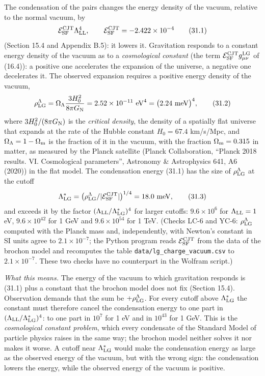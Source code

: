 \documentclass[
  10pt,
]{article}
\begin{document}
The condensation of the pairs changes the energy density of the vacuum,
relative to the normal vacuum, by
\[\mathcal E^{\rm CJT}_{\rm SF}\Lambda_{\rm LL}^4,\qquad\mathcal E^{\rm CJT}_{\rm SF}=-2.422\times10^{-4}\tag{31.1}\]
(Section 15.4 and Appendix B.5): it lowers it. Gravitation responds to a
constant energy density of the vacuum as to a \emph{cosmological
constant} (the term \(\mathcal E^{\rm CJT}_{\rm SF}g^{\rm LG}_{\mu\nu}\)
of (16.4)): a positive one accelerates the expansion of the universe, a
negative one decelerates it. The observed expansion requires a positive
energy density of the vacuum,
\[\rho^\Lambda_{\rm LG}=\Omega_\Lambda\frac{3H_0^2}{8\pi G_{\rm N}}=2.52\times10^{-11}\ {\rm eV}^4=\big(2.24\ {\rm meV}\big)^4,\tag{31.2}\]
where \(3H_0^2/(8\pi G_{\rm N})\) is the \emph{critical density}, the
density of a spatially flat universe that expands at the rate of the
Hubble constant \(H_0=67.4\) km/s/Mpc, and
\(\Omega_\Lambda=1-\Omega_{\rm m}\) is the fraction of it in the vacuum,
with the fraction \(\Omega_{\rm m}=0.315\) in matter, as measured by the
Planck satellite (Planck Collaboration, ``Planck 2018 results. VI.
Cosmological parameters'', Astronomy \& Astrophysics 641, A6 (2020)) in
the flat model. The condensation energy (31.1) has the size of
\(\rho^\Lambda_{\rm LG}\) at the cutoff
\[\Lambda^*_{\rm LG}=\big(\rho^\Lambda_{\rm LG}/\lvert\mathcal E^{\rm CJT}_{\rm SF}\rvert\big)^{1/4}=18.0\ {\rm meV},\tag{31.3}\]
and exceeds it by the factor \((\Lambda_{\rm LL}/\Lambda^*_{\rm LG})^4\)
for larger cutoffs: \(9.6\times10^{6}\) for \(\Lambda_{\rm LL}=1\) eV,
\(9.6\times10^{42}\) for 1 GeV and \(9.6\times10^{54}\) for 1 TeV.
(Checks LC-6 and YC-6: \(\rho^\Lambda_{\rm LG}\) computed with the
Planck mass and, independently, with Newton's constant in SI units agree
to \(2.1\times10^{-7}\); the Python program reads
\(\mathcal E^{\rm CJT}_{\rm SF}\) from the data of the brochon model and
recomputes the table \texttt{data/lg\_charge\_vacuum.csv} to
\(2.1\times10^{-7}\). These two checks have no counterpart in the
Wolfram script.)

\emph{What this means.} The energy of the vacuum to which gravitation
responds is (31.1) plus a constant that the brochon model does not fix
(Section 15.4). Observation demands that the sum be
\(+\rho^\Lambda_{\rm LG}\). For every cutoff above
\(\Lambda^*_{\rm LG}\) the constant must therefore cancel the
condensation energy to one part in
\((\Lambda_{\rm LL}/\Lambda^*_{\rm LG})^4\): to one part in \(10^7\) for
1 eV and in \(10^{43}\) for 1 GeV. This is the \emph{cosmological
constant problem}, which every condensate of the Standard Model of
particle physics raises in the same way; the brochon model neither
solves it nor makes it worse. A cutoff near \(\Lambda^*_{\rm LG}\) would
make the condensation energy as large as the observed energy of the
vacuum, but with the wrong sign: the condensation lowers the energy,
while the observed energy of the vacuum is positive.
\end{document}
